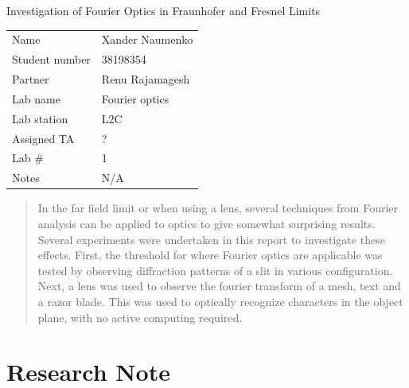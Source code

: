 \documentclass[letterpaper, reqno,11pt]{article}
\begin{document}
\begin{titlepage}
\centering


\Large Investigation of Fourier Optics in Fraunhofer and Fresnel Limits

\normalsize




\begin{tabular}{ll}
Name & Xander Naumenko \\[2ex]
Student number & 38198354 \\[2ex]
Partner & Renu Rajamagesh \\[2ex]
Lab name & Fourier optics \\[2ex]
Lab station  & L2C \\[2ex]
Assigned TA            & ? \\[2ex]
Lab \#            & 1 \\[2ex]
Notes &  N/A
\end{tabular}



\end{titlepage}

\begin{abstract}
    In the far field limit or when using a lens, several techniques from Fourier analysis can be applied to optics to give somewhat surprising results. Several experiments were undertaken in this report to investigate these effects. First, the threshold for where Fourier optics are applicable was tested by observing diffraction patterns of a slit in various configuration. Next, a lens was used to observe the fourier transform of a mesh, text and a razor blade. This was used to optically recognize characters in the object plane, with no active computing required.
\end{abstract}

\newpage

\section{Research Note}
\end{document}
